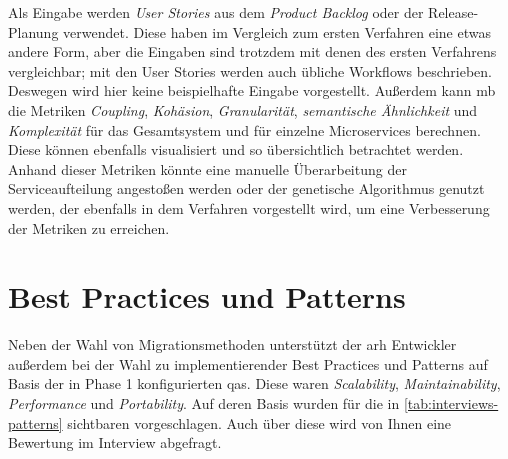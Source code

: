Als Eingabe werden \emph{User Stories} aus dem \emph{Product Backlog} oder der Release-Planung verwendet.
Diese haben im Vergleich zum ersten Verfahren eine etwas andere Form, aber die Eingaben sind trotzdem mit denen des ersten Verfahrens vergleichbar; mit den User Stories werden auch übliche Workflows beschrieben.
Deswegen wird hier keine beispielhafte Eingabe vorgestellt.
Außerdem kann \gls{mb} die Metriken  \emph{Coupling}, \emph{Kohäsion}, \emph{Granularität}, \emph{semantische Ähnlichkeit} und \emph{Komplexität} für das Gesamtsystem und für einzelne Microservices berechnen. 
Diese können ebenfalls visualisiert und so übersichtlich betrachtet werden.
Anhand dieser Metriken könnte eine manuelle Überarbeitung der Serviceaufteilung angestoßen werden oder der genetische Algorithmus genutzt werden, der ebenfalls in dem Verfahren vorgestellt wird, um eine Verbesserung der Metriken zu erreichen. 

\section{Best Practices und Patterns}

Neben der Wahl von Migrationsmethoden unterstützt der \gls{arh} Entwickler außerdem bei der Wahl zu implementierender Best Practices und Patterns auf Basis der in Phase 1 konfigurierten \glspl{qa}.
Diese waren \emph{Scalability}, \emph{Maintainability}, \emph{Performance} und \emph{Portability}.
Auf deren Basis wurden für \jf die in \cref{tab:interviews-patterns} sichtbaren \bpp vorgeschlagen.
Auch über diese wird von Ihnen eine Bewertung im Interview abgefragt.

